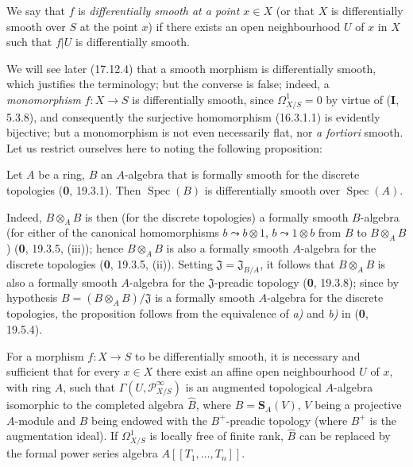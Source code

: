 We say that $f$ is \emph{differentially smooth at a point $x\in X$} (or
that $X$ is differentially smooth over $S$ at the point $x$) if there exists an
open neighbourhood $U$ of $x$ in $X$ such that $f|U$ is differentially
smooth.

We will see later (17.12.4) that a smooth morphism is differentially
smooth, which justifies the terminology; but the converse is false; indeed,
a \emph{monomorphism} $f:X\to S$ is differentially smooth,
since $\varOmega_{X/S}^1=0$ by virtue of (\textbf{I}, 5.3.8), and consequently the
surjective homomorphism (16.3.1.1) is evidently bijective; but a
monomorphism is not even necessarily flat, nor \emph{a fortiori} smooth.
Let us restrict ourselves here to noting the following proposition:

\begin{proposition}[16.10.2]
\label{IV.16.10.2}
Let $A$ be a ring, $B$ an $A$-algebra that is formally smooth for the
discrete topologies \textup{(\textbf{0}, 19.3.1)}. Then $\operatorname{Spec}(B)$ is
differentially smooth over $\operatorname{Spec}(A)$.
\end{proposition}

Indeed, $B\otimes_A B$ is then (for the discrete topologies) a formally
smooth $B$-algebra (for either of the canonical
homomorphisms $b\leadsto b\otimes1$, $b\leadsto1\otimes b$ from $B$
to $B\otimes_A B$) (\textbf{0}, 19.3.5, (iii)); hence $B\otimes_A B$ is also a
formally smooth $A$-algebra for the discrete topologies (\textbf{0}, 19.3.5,
(ii)). Setting $\mathfrak{J}=\mathfrak{J}_{B/A}$, it follows that
$B\otimes_A B$ is also a formally smooth $A$-algebra for the
$\mathfrak{J}$-preadic topology (\textbf{0}, 19.3.8); since by hypothesis
$B=(B\otimes_A B)/\mathfrak{J}$ is a formally smooth $A$-algebra for
the discrete topologies, the proposition follows from the equivalence of \emph{a)}
and \emph{b)} in (\textbf{0}, 19.5.4).

\begin{proposition}[16.10.3]
\label{IV.16.10.3}
For a morphism $f:X\to S$ to be differentially smooth, it is necessary and
sufficient that for every $x\in X$ there exist an affine open neighbourhood
$U$ of $x$, with ring $A$, such that $\Gamma(U,\mathscr{P}_{X/S}^{\infty})$ is
an augmented topological $A$-algebra isomorphic to the completed algebra
$\widehat B$, where $B=\mathbf{S}_A(V)$, $V$ being a projective $A$-module and
$B$ being endowed with the $B^+$-preadic topology (where $B^+$ is the
augmentation ideal). If $\varOmega_{X/S}^1$ is locally free of finite rank,
$\widehat B$ can be replaced by the formal power series algebra
$A[[T_1,\ldots,T_n]]$.
\end{proposition}

